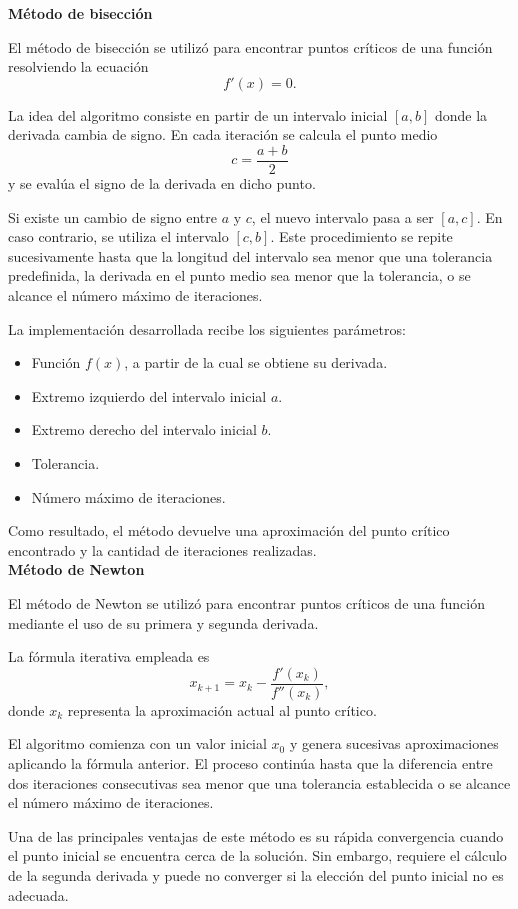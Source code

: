 \documentclass[12pt]{article}
\begin{document}
\textbf{Método de bisección}

El método de bisección se utilizó para encontrar puntos críticos de una función resolviendo la ecuación
\[
f'(x) = 0.
\]

La idea del algoritmo consiste en partir de un intervalo inicial $[a,b]$ donde la derivada cambia de signo. En cada iteración se calcula el punto medio
\[
c = \frac{a+b}{2}
\]
y se evalúa el signo de la derivada en dicho punto.

Si existe un cambio de signo entre $a$ y $c$, el nuevo intervalo pasa a ser $[a,c]$. En caso contrario, se utiliza el intervalo $[c,b]$. Este procedimiento se repite sucesivamente hasta que la longitud del intervalo sea menor que una tolerancia predefinida, la derivada en el punto medio sea menor que la tolerancia, o se alcance el número máximo de iteraciones.

La implementación desarrollada recibe los siguientes parámetros:

\begin{itemize}
\item Función $f(x)$, a partir de la cual se obtiene su derivada.
\item Extremo izquierdo del intervalo inicial $a$.
\item Extremo derecho del intervalo inicial $b$.
\item Tolerancia.
\item Número máximo de iteraciones.
\end{itemize}

Como resultado, el método devuelve una aproximación del punto crítico encontrado y la cantidad de iteraciones realizadas.\\



\textbf{Método de Newton}

El método de Newton se utilizó para encontrar puntos críticos de una función mediante el uso de su primera y segunda derivada.

La fórmula iterativa empleada es
\[
x_{k+1} = x_k - \frac{f'(x_k)}{f''(x_k)},
\]
donde $x_k$ representa la aproximación actual al punto crítico.

El algoritmo comienza con un valor inicial $x_0$ y genera sucesivas aproximaciones aplicando la fórmula anterior. El proceso continúa hasta que la diferencia entre dos iteraciones consecutivas sea menor que una tolerancia establecida o se alcance el número máximo de iteraciones.

Una de las principales ventajas de este método es su rápida convergencia cuando el punto inicial se encuentra cerca de la solución. Sin embargo, requiere el cálculo de la segunda derivada y puede no converger si la elección del punto inicial no es adecuada.
\end{document}
